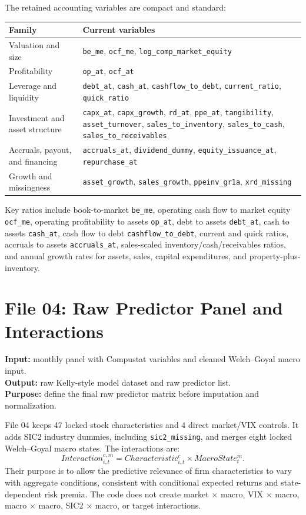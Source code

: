 \documentclass[11pt,a4paper]{article}
\newcommand{\code}[1]{\texttt{#1}}
\begin{document}
The retained accounting variables are compact and standard:
\begin{center}
\begin{tabularx}{\textwidth}{p{4.1cm}Y}
\toprule
Family & Current variables \\
\midrule
Valuation and size & \code{be\_me}, \code{ocf\_me}, \code{log\_comp\_market\_equity} \\
Profitability & \code{op\_at}, \code{ocf\_at} \\
Leverage and liquidity & \code{debt\_at}, \code{cash\_at}, \code{cashflow\_to\_debt}, \code{current\_ratio}, \code{quick\_ratio} \\
Investment and asset structure & \code{capx\_at}, \code{capx\_growth}, \code{rd\_at}, \code{ppe\_at}, \code{tangibility}, \code{asset\_turnover}, \code{sales\_to\_inventory}, \code{sales\_to\_cash}, \code{sales\_to\_receivables} \\
Accruals, payout, and financing & \code{accruals\_at}, \code{dividend\_dummy}, \code{equity\_issuance\_at}, \code{repurchase\_at} \\
Growth and missingness & \code{asset\_growth}, \code{sales\_growth}, \code{ppeinv\_gr1a}, \code{xrd\_missing} \\
\bottomrule
\end{tabularx}
\end{center}

Key ratios include book-to-market \code{be\_me}, operating cash flow to market equity \code{ocf\_me}, operating profitability to assets \code{op\_at}, debt to assets \code{debt\_at}, cash to assets \code{cash\_at}, cash flow to debt \code{cashflow\_to\_debt}, current and quick ratios, accruals to assets \code{accruals\_at}, sales-scaled inventory/cash/receivables ratios, and annual growth rates for assets, sales, capital expenditures, and property-plus-inventory.

\section{File 04: Raw Predictor Panel and Interactions}

\textbf{Input:} monthly panel with Compustat variables and cleaned Welch--Goyal macro input. \\
\textbf{Output:} raw Kelly-style model dataset and raw predictor list. \\
\textbf{Purpose:} define the final raw predictor matrix before imputation and normalization.

File 04 keeps 47 locked stock characteristics and 4 direct market/VIX controls. It adds SIC2 industry dummies, including \code{sic2\_missing}, and merges eight locked Welch--Goyal macro states. The interactions are:
\[
  Interaction_{i,t}^{c,m}=Characteristic_{i,t}^{c}\times MacroState_{t}^{m}.
\]
Their purpose is to allow the predictive relevance of firm characteristics to vary with aggregate conditions, consistent with conditional expected returns and state-dependent risk premia. The code does not create market $\times$ macro, VIX $\times$ macro, macro $\times$ macro, SIC2 $\times$ macro, or target interactions.
\end{document}
